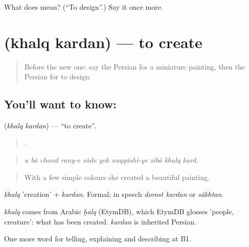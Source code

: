 \begin{tcolorbox}[breakable,colback=teal!4,colframe=teal!35!black,title={Before you move on}]
What does   mean? (\textquotedblleft{}To design\textquotedblright{}.) Say it once more.
\end{tcolorbox}
\section[\texorpdfstring{\fa{خلق} \fa{کردن} (khalq kardan)}{خلق کردن (khalq kardan)}]{  (khalq kardan) — to create}

\label{lesson:FA-C526-khalq-kardan}



\begin{quote}
Before the new one: say the Persian for a miniature painting, then the Persian for to design.
\end{quote}

\subsection*{You'll want to know:  }
\textbf{ } (\emph{khalq kardan}) — \textquotedblleft{}to create\textquotedblright{}.

\begin{quote}
         .
\end{quote}

\begin{quote}
\emph{u bâ chand rang-e sâde yek naqqâshi-ye zibâ khalq kard.}
\end{quote}

\begin{quote}
With a few simple colours she created a beautiful painting.
\end{quote}

\emph{khalq} 'creation' + \emph{kardan}. Formal; in speech \emph{dorost kardan} or \emph{sâkhtan}.

\begin{cousinweb}
\emph{khalq} comes from Arabic \emph{ḫalq} (EtymDB), which EtymDB glosses 'people, creature': what has been created. \emph{kardan} is inherited Persian.
\end{cousinweb}

\begin{grammarlens}[title={What you've built}]
One more word for telling, explaining and describing at B1.
\end{grammarlens}

